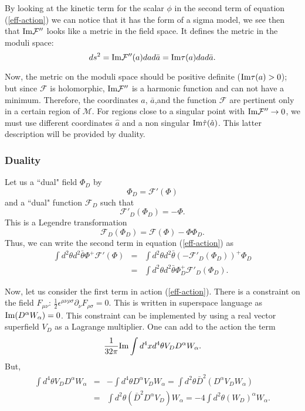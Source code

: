 \documentclass[12pt, onecolumn]{article}
\begin{document}
By looking at the kinetic term for the scalar $\phi$ in the second term of equation (\ref{eff-action}) we can notice that it has the form of a sigma model, we see then that ${\rm Im} \mathcal{F}''$ looks like a metric in the field space. It defines the metric in the moduli space:
\begin{equation}
ds^2= {\rm Im} \mathcal{F}''(a) da d\bar{a} = {\rm Im} \tau(a) da d\bar{a}. \label{metric}
\end{equation}

Now, the metric on the moduli space should be positive definite (${\rm Im}\tau(a)>0$); but since $\mathcal{F}$ is holomorphic, ${\rm Im }\mathcal{F}''$ is a harmonic function and can not have a minimum. Therefore, the coordinates $a$, $\bar{a}$,and the function $\mathcal{F}$ are pertinent only in a certain region of $\mathcal{M}$. For regions close to a singular point with ${\rm Im }\mathcal{F}''\rightarrow 0$, we must use different coordinates $\hat{a}$ and a non singular ${\rm Im} \hat{\tau}(\hat{a})$. This latter description will be provided by duality.

\subsubsection{Duality}

Let us a ``dual" field $\Phi_D$ by
\begin{equation}
\Phi_D = \mathcal{F}'(\Phi)
\end{equation}
and a ``dual" function $\mathcal{F}_D$ such that
\begin{equation}
\mathcal{F}'_D(\Phi_D)=-\Phi.
\end{equation} This is a Legendre transformation $$ \mathcal{F}_D(\Phi_D)=\mathcal{F}(\Phi)-\Phi \Phi_D.$$
Thus, we can write the second term in equation (\ref{eff-action}) as
\begin{eqnarray}
\int d^2\theta d^2 \bar{\theta} \Phi^+ \mathcal{F}'(\Phi) &=& \int d^2\theta d^2 \bar{\theta} (-\mathcal{F}'_D(\Phi_D))^+ \Phi_D \nonumber \\
&=& \int d^2\theta d^2 \bar{\theta} \Phi_D^+ \mathcal{F}'_D(\Phi_D).\label{dualF}
\end{eqnarray}


Now, let us consider the first term in action (\ref{eff-action}).  There is a constraint on the field $F_{\mu\nu}$: $\frac{1}{2}\epsilon^{\mu\nu\rho\sigma}\partial_\nu F_{\rho\sigma}=0$.  This is written in superspace language as ${\rm Im} (D^\alpha W_\alpha)=0$.  This constraint can be implemented by using a real vector superfield $V_D$ as a Lagrange multiplier. One can add to the action the term
\begin{equation}
\frac{1}{32\pi} {\rm Im} \int d^4x d^4\theta V_D D^\alpha W_\alpha.\label{add}
\end{equation}
But, 
\begin{eqnarray}
\int d^4\theta V_D D^\alpha W_\alpha &=&- \int d^4\theta D^\alpha V_D W_\alpha= \int d^2\theta \bar{D}^2( D^\alpha V_D W_\alpha) \\
&=&\int d^2\theta (\bar{D}^2 D^\alpha V_D) W_\alpha=-4 \int d^2\theta (W_D)^\alpha W_\alpha .\nonumber
\end{eqnarray}
\end{document}
